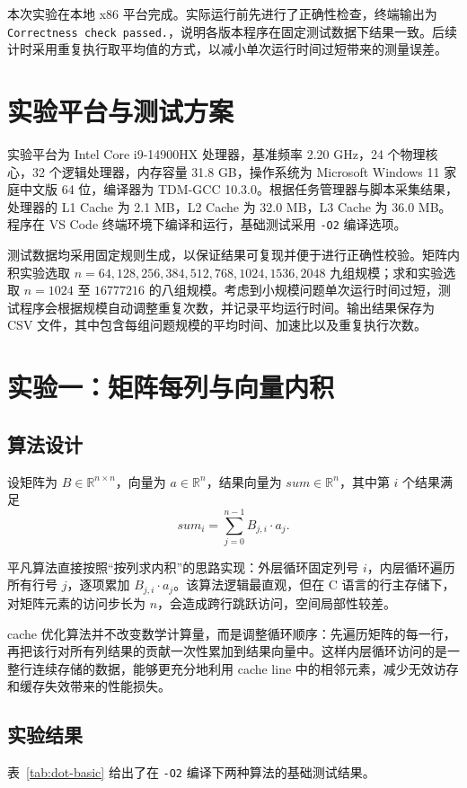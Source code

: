 \documentclass[a4paper,10pt]{article}
\begin{document}
本次实验在本地 x86 平台完成。实际运行前先进行了正确性检查，终端输出为 \texttt{Correctness check passed.}，说明各版本程序在固定测试数据下结果一致。后续计时采用重复执行取平均值的方式，以减小单次运行时间过短带来的测量误差。

\section{实验平台与测试方案}
实验平台为 Intel Core i9-14900HX 处理器，基准频率 2.20 GHz，24 个物理核心，32 个逻辑处理器，内存容量 31.8 GB，操作系统为 Microsoft Windows 11 家庭中文版 64 位，编译器为 TDM-GCC 10.3.0。根据任务管理器与脚本采集结果，处理器的 L1 Cache 为 2.1 MB，L2 Cache 为 32.0 MB，L3 Cache 为 36.0 MB。程序在 VS Code 终端环境下编译和运行，基础测试采用 \texttt{-O2} 编译选项。

测试数据均采用固定规则生成，以保证结果可复现并便于进行正确性校验。矩阵内积实验选取 $n=64,128,256,384,512,768,1024,1536,2048$ 九组规模；求和实验选取 $n=1024$ 至 $16777216$ 的八组规模。考虑到小规模问题单次运行时间过短，测试程序会根据规模自动调整重复次数，并记录平均运行时间。输出结果保存为 CSV 文件，其中包含每组问题规模的平均时间、加速比以及重复执行次数。

\section{实验一：矩阵每列与向量内积}
\subsection{算法设计}
设矩阵为 $B\in\mathbb{R}^{n\times n}$，向量为 $a\in\mathbb{R}^{n}$，结果向量为 $sum\in\mathbb{R}^{n}$，其中第 $i$ 个结果满足
\[
sum_i=\sum_{j=0}^{n-1}B_{j,i}\cdot a_j.
\]

平凡算法直接按照“按列求内积”的思路实现：外层循环固定列号 $i$，内层循环遍历所有行号 $j$，逐项累加 $B_{j,i}\cdot a_j$。该算法逻辑最直观，但在 C 语言的行主存储下，对矩阵元素的访问步长为 $n$，会造成跨行跳跃访问，空间局部性较差。

cache 优化算法并不改变数学计算量，而是调整循环顺序：先遍历矩阵的每一行，再把该行对所有列结果的贡献一次性累加到结果向量中。这样内层循环访问的是一整行连续存储的数据，能够更充分地利用 cache line 中的相邻元素，减少无效访存和缓存失效带来的性能损失。

\subsection{实验结果}
表~\ref{tab:dot-basic} 给出了在 \texttt{-O2} 编译下两种算法的基础测试结果。
\end{document}
